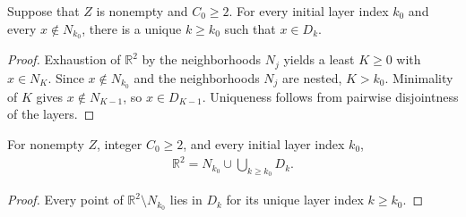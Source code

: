 \begin{lemma}
    \label{thm:area_law_unique_layer}
    \leanok
    Suppose that $Z$ is nonempty and $C_0\ge2$. For every initial layer
    index $k_0$ and every $x\notin N_{k_0}$, there is a unique
    $k\ge k_0$ such that $x\in D_k$.
\end{lemma}
\begin{proof}\leanok
    Exhaustion of $\mathbb R^2$ by the neighborhoods $N_j$ yields a least
    $K\ge0$ with $x\in N_K$. Since $x\notin N_{k_0}$ and the neighborhoods
    $N_j$ are nested, $K>k_0$. Minimality of $K$ gives $x\notin N_{K-1}$,
    so $x\in D_{K-1}$. Uniqueness follows from pairwise disjointness of the
    layers.
\end{proof}

\begin{lemma}
    \label{thm:area_law_dummy_layers_cover}
    \leanok
    For nonempty $Z$, integer $C_0\ge2$, and every initial layer index $k_0$,
    \begin{align}
        \mathbb R^2=N_{k_0}\cup\bigcup_{k\ge k_0}D_k.
    \end{align}
\end{lemma}
\begin{proof}\leanok
    Every point of $\mathbb R^2\setminus N_{k_0}$ lies in $D_k$ for its
    unique layer index $k\ge k_0$.
\end{proof}
